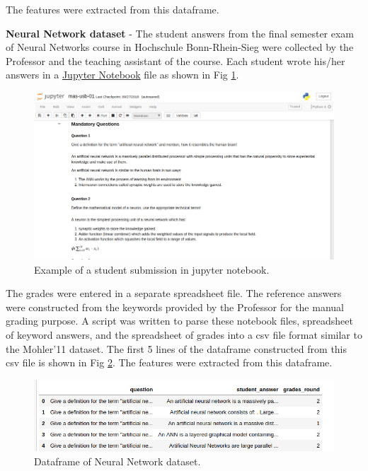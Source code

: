     The features were extracted from this dataframe.
    
    \textbf{Neural Network dataset} - The student answers from the final semester exam of Neural Networks course in Hochschule Bonn-Rhein-Sieg were collected by the Professor and the teaching assistant of the course. Each student wrote his/her answers in a \href{jupyter.org}{Jupyter Notebook} file as shown in Fig \ref{nn_notebook}. 
    
    \begin{figure}[h]
    	\centering
    	\includegraphics[scale=0.4]{images/nn_notebook}
    	\caption{Example of a student submission in jupyter notebook.}
    	\label{nn_notebook}
    \end{figure} 
    
    The grades were entered in a separate spreadsheet file. The reference answers were constructed from the keywords provided by the Professor for the manual grading purpose. A script was written to parse these notebook files, spreadsheet of keyword answers, and the spreadsheet of grades into a csv file format similar to the Mohler'11 dataset. The first 5 lines of the dataframe constructed from this csv file is shown in Fig \ref{nn_df}. The features were extracted from this dataframe.
    
    \begin{figure}[h]
    	\centering
    	\includegraphics[scale=0.4]{images/nn_df}
    	\caption{Dataframe of Neural Network dataset.}
    	\label{nn_df}
    \end{figure} 
    
